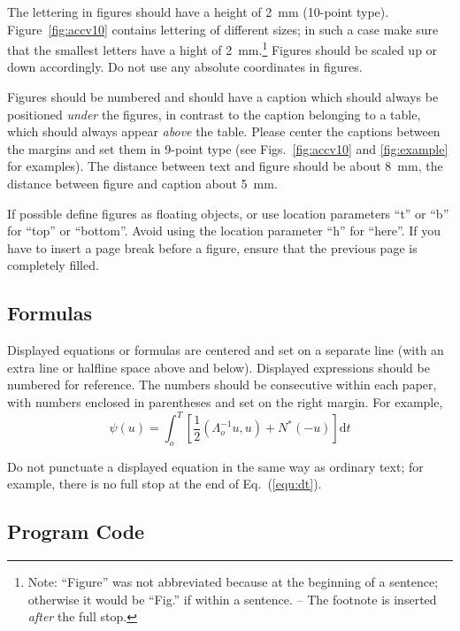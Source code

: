 \documentclass[runningheads]{llncs}
\begin{document}
The lettering in figures should have a height of 2~mm (10-point type).
Figure~\ref{fig:accv10} contains lettering of different sizes; in such a case
make sure that the smallest letters have a hight of 2~mm.\footnote
   {Note: ``Figure''
    was not abbreviated because at the beginning of a sentence; otherwise
    it would be ``Fig.'' if within a sentence. -- The footnote is inserted {\it after}
    the full stop.
    }
Figures should be scaled up or down accordingly.
Do not use any absolute coordinates in figures.

Figures should be numbered and should have a caption which should
always be positioned {\it under} the figures, in contrast to the caption
belonging to a table, which should always appear {\it above} the table.
Please center the captions between the margins and set them in
9-point type (see Figs.~\ref{fig:accv10} and \ref{fig:example} for examples).
The distance between text and figure should be about 8~mm, the
distance between figure and caption about 5~mm.

If possible define figures as floating
objects, or use location parameters ``t'' or ``b'' for ``top'' or ``bottom''. Avoid using the location
parameter ``h'' for ``here''. If you have to insert a page break before a
figure, ensure that the previous page is completely filled.

\subsection{Formulas}

Displayed equations or formulas are centered and set on a separate
line (with an extra line or halfline space above and below). Displayed
expressions should be numbered for reference. The numbers should be
consecutive within each paper,
with numbers enclosed in parentheses and set on the right margin.
For example,
%
\begin{equation}
  \psi (u) = \int_{o}^{T} \left[\frac{1}{2}
  \left(\Lambda_{o}^{-1} u,u\right) + N^{\ast} (-u)\right] \mathrm{d}t
  \label{equ:dt}
\end{equation}

Do not punctuate a displayed equation in the same way as ordinary
text; for example, there is no full stop at the end of Eq.~(\ref{equ:dt}).

\subsection{Program Code}
\end{document}
